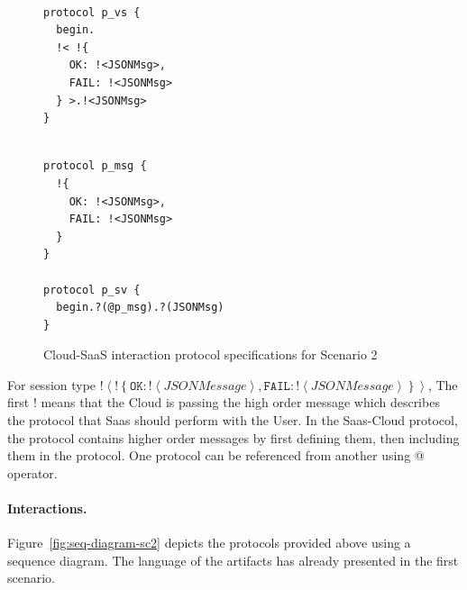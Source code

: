 \documentclass[10pt]{llncs}
\begin{document}
{
\lstset{
  framerule=0pt,
  numbers=none,
  basicstyle=\ttfamily\scriptsize,
}
\renewcommand\lstlistingname{Protocol}
\setcounter{lstlisting}{0}
\begin{figure}

\begin{minipage}[t]{0.50\textwidth}
\begin{lstlisting}[caption=Cloud]

protocol p_vs {
  begin.
  !< !{
    OK: !<JSONMsg>, 
    FAIL: !<JSONMsg>
  } >.!<JSONMsg>    
}

\end{lstlisting}
\end{minipage}
\begin{minipage}[t]{0.50\textwidth}
\begin{lstlisting}[caption=Cloud]

protocol p_msg { 
  !{
    OK: !<JSONMsg>,
    FAIL: !<JSONMsg> 
  }
}

protocol p_sv {
  begin.?(@p_msg).?(JSONMsg) 
}

\end{lstlisting}
\end{minipage}
\caption{Cloud-SaaS interaction protocol specifications for Scenario 2}\label{fig:cloud-saas-providers} 
\end{figure}
}

For session type $\mathopen{!}\left<\mathopen{!}\left\{\texttt{OK}\colon \mathopen{!}\left<\textit{JSONMessage}\right>, \texttt{FAIL}\colon \mathopen{!}\left<\textit{JSONMessage}\right>\right\}\right>$, The first ! means that the Cloud is passing the high order message which describes the protocol that Saas should perform with the User.
In the Saas-Cloud protocol, the protocol contains higher order messages by first defining them, then including them in the protocol.
One protocol can be referenced from another using @ operator. %



\paragraph{Interactions.} Figure~\ref{fig:seq-diagram-sc2} depicts the protocols provided above using a sequence diagram. The language of the artifacts has already presented in the first scenario.
\end{document}
